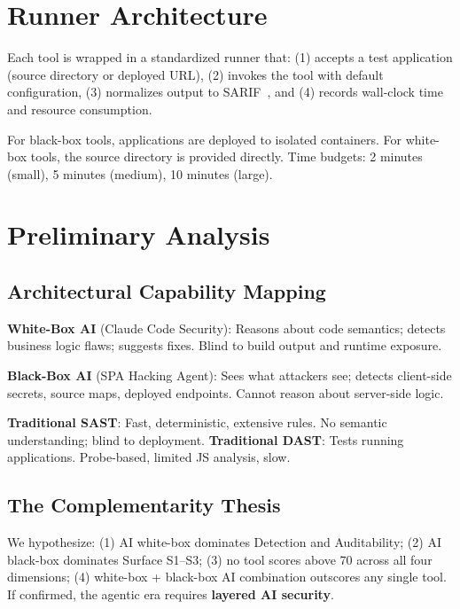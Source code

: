 \documentclass[11pt,twocolumn]{article}
\begin{document}
\section{Runner Architecture}

Each tool is wrapped in a standardized runner that: (1) accepts a test application (source directory or deployed URL), (2) invokes the tool with default configuration, (3) normalizes output to SARIF~\cite{sarif2018}, and (4) records wall-clock time and resource consumption.

For black-box tools, applications are deployed to isolated containers. For white-box tools, the source directory is provided directly. Time budgets: 2 minutes (small), 5 minutes (medium), 10 minutes (large).

\section{Preliminary Analysis}

\subsection{Architectural Capability Mapping}

\textbf{White-Box AI} (Claude Code Security): Reasons about code semantics; detects business logic flaws; suggests fixes. Blind to build output and runtime exposure.

\textbf{Black-Box AI} (SPA Hacking Agent): Sees what attackers see; detects client-side secrets, source maps, deployed endpoints. Cannot reason about server-side logic.

\textbf{Traditional SAST}: Fast, deterministic, extensive rules. No semantic understanding; blind to deployment. \textbf{Traditional DAST}: Tests running applications. Probe-based, limited JS analysis, slow.

\subsection{The Complementarity Thesis}

We hypothesize: (1) AI white-box dominates Detection and Auditability; (2) AI black-box dominates Surface S1--S3; (3) no tool scores above 70 across all four dimensions; (4) white-box + black-box AI combination outscores any single tool. If confirmed, the agentic era requires \textbf{layered AI security}.
\end{document}
